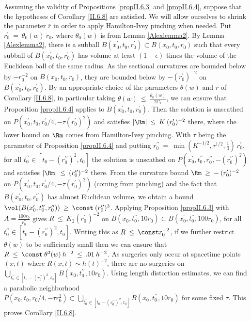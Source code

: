 Assuming the validity of Propositions \ref{propII.6.3} and \ref{propII.6.4},
suppose that the hypotheses of Corollary \ref{II.6.8} are satisfied.
We will allow ourselves to shrink the parameter $\overline{r}$ in order
to apply Hamilton-Ivey pinching when needed.
Put $r_0^\prime \: = \: \theta_0(w) \: r_0$, where $\theta_0(w)$ is
from Lemma \ref{Alexlemma2}.
By Lemma \ref{Alexlemma2}, there is a subball $B(x_0^\prime, t_0, r_0^\prime) \subset
B(x_0, t_0, r_0)$ such that every subball of
$B(x_0^\prime,t_0, r_0^\prime)$ has volume at least
$(1-\epsilon)$ times the volume of the Euclidean ball of the same
radius.  As the sectional curvatures are bounded below by $- r_0^{-2}$ on
$B(x_0, t_0, r_0)$, they are bounded below by $- (r_0^\prime)^{-2}$ on
$B(x^\prime_0, t_0, r_0^\prime)$. By an appropriate choice of the
parameters $\theta(w)$ and $\overline{r}$ of Corollary \ref{II.6.8},
in particular taking $\theta(w) \: \le \: \frac{\theta_0(w)}{2C_1}$, we can
ensure that Proposition \ref{propII.6.4}
applies to $B(x^\prime_0, t_0, r_0^\prime)$.
Then the solution is unscathed on
$P(x_0^\prime, t_0, r_0^\prime/4, - \tau (r_0^\prime)^2)$ and satisfies
$|\Rm| \: \le \: K \: (r_0^\prime)^{-2}$ there, where the lower
bound on $\Rm$ comes from Hamilton-Ivey pinching.
With $\tau$ being the parameter of Proposition \ref{propII.6.4} and
putting
$r_0^{\prime \prime} \: = \: \min(K^{-1/2}, \tau^{1/2}, \frac14) \: r_0^\prime$,
for all $t_0^{\prime \prime} \in
[t_0 - (r_0^{\prime \prime})^2, t_0]$ the
solution is unscathed on $P(x_0^\prime, t_0^{\prime \prime},
r_0^{\prime \prime}, -(r_0^{\prime \prime})^2)$ and satisfies
$|\Rm| \: \le \: (r_0^{\prime \prime})^{-2}$ there.
From the curvature bound $\Rm \: \ge \: - \: (r_0^\prime)^{-2}$ on
$P(x_0^\prime, t_0, r_0^\prime/4, - \tau (r_0^\prime)^2)$
(coming from pinching)
and the fact that $B(x^\prime_0, t_0, r_0^{\prime \prime})$
has almost Euclidean volume, we obtain a bound
$\vol(B(x^\prime_0, t_0^{\prime \prime},
r_0^{\prime \prime})) \: \ge \: \const \:
(r_0^{\prime \prime})^{3}$.
Applying Proposition \ref{propII.6.3} with
$A = \frac{100r_0}{r_0^{\prime \prime}}$ gives
$R \: \le \: K_2 (r_0^{\prime \prime})^{-2}$ on
$B(x_0, t_0^{\prime \prime}, 10 r_0) \subset
B(x_0^\prime, t_0^{\prime \prime}, 100 r_0)$,
for all $t_0^{\prime \prime} \in
[t_0 - (r_0^{\prime \prime})^2, t_0]$.
Writing this as
$R \: \le \: \const r_0^{-2}$,
if we further restrict $\theta(w)$ to be sufficiently
small then we can ensure that $R \: \le \: \const \: \theta^2(w) \: h^{-2}
\: \le \: .01 \: h^{-2}$. As surgeries only occur
at spacetime points $(x,t)$ where
$R(x,t) \sim h(t)^{-2}$,
there are no surgeries on
$\bigcup_{t_0^{\prime \prime} \in
[t_0 - (r_0^{\prime \prime})^2, t_0]} B(x_0, t_0^{\prime \prime}, 10 r_0)$.
Using length distortion estimates,
we can find a parabolic neighborhood
$P(x_0, t_0, r_0/4, - \tau r_0^2) \subset
\bigcup_{t_0^{\prime \prime} \in
[t_0 - (r_0^{\prime \prime})^2, t_0]} B(x_0, t_0^{\prime \prime}, 10 r_0)$
for some fixed $\tau$.
This proves Corollary \ref{II.6.8}.





